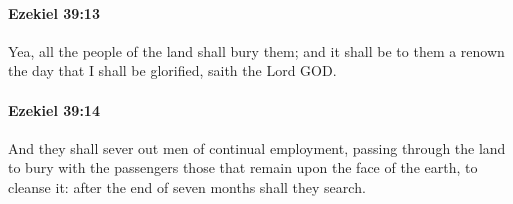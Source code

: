 		\paragraph{Ezekiel 39:13} %
			\label{EZEKIEL-39-13}

			Yea, all the people of the land shall bury them; and it shall be to them a renown the day that I shall be glorified, saith the Lord GOD.


		\paragraph{Ezekiel 39:14} %
			\label{EZEKIEL-39-14}

			And they shall sever out men of continual employment, passing through the land to bury with the passengers those that remain upon the face of the earth, to cleanse it: after the end of seven months shall they search.


